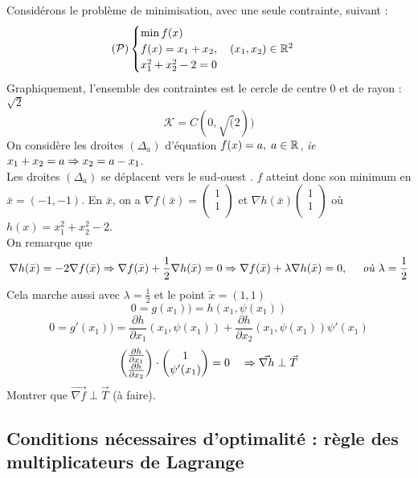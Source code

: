 \begin{exemple}
	Considérons le problème de minimisation, avec une seule contrainte, suivant : 
	\[ (\mathcal{P})\begin{cases}\min f(x) \\ f(x)=x_1+x_2, \quad (x_1,x_2)\in\mathbb{R}^2 \\ x_1^2+x_2^2-2=0 \end{cases} \]
	Graphiquement, l'ensemble des contraintes est le cercle de centre 0 et de rayon : $\sqrt 2$ \[ \mathcal{K} = C(0, \sqrt(2)) \]
	On considère les droites $(\Delta_a)$ d'équation $f(x)=a, \; a\in\mathbb{R}$, \textit{ie} $x_1+x_2=a \Rightarrow x_2=a-x_1$.\\
	Les droites $(\Delta_a)$ se déplacent vers le \og sud-ouest \fg. $f$ atteint donc son minimum en $\bar{x} = (-1, -1)$.
	En $\bar{x}$, on a $\displaystyle \nabla f(\bar{x}) = \begin{pmatrix} 1\\ 1\\ \end{pmatrix} $ et $\displaystyle \nabla h(\bar{x}) \begin{pmatrix} 1\\ 1\\ \end{pmatrix}  $ où $h(x) = x_1^2 + x_2^2 - 2$.\\
	On remarque que \[ \nabla h( \bar{x} ) = -2  \nabla f(\bar{x}) \Rightarrow \nabla f(\bar{x})+\frac{1}{2}\nabla h(\bar{x})=0 \Rightarrow \nabla f(\bar{x})+\lambda\nabla h(\bar{x})=0, \quad\textit{ où }\lambda=\frac{1}{2}\]
	Cela marche aussi avec $\lambda=\frac{1}{2}$ et le point $\tilde{x}=(1,1)$
	\[ 0=g(x_1))=h(x_1,\psi(x_1)) \]
	\[ 0=g'(x_1))=\frac{\partial h}{\partial x_1}(x_1,\psi(x_1))+\frac{\partial h}{\partial x_2}(x_1,\psi(x_1))\psi'(x_1) \]
	\[ \begin{pmatrix} \frac{\partial h}{\partial x_1}\\ \frac{\partial h}{\partial x_2}\\ \end{pmatrix} \cdot \begin{pmatrix} 1\\ \psi'(x_1)\\ \end{pmatrix}=0 \quad \Rightarrow \vec{\nabla h} \perp \vec{T} \]
	Montrer que $\vec{\nabla f} \perp \vec{T}$ (à faire).
\end{exemple}

\subsection{Conditions nécessaires d'optimalité : règle des multiplicateurs de Lagrange}


